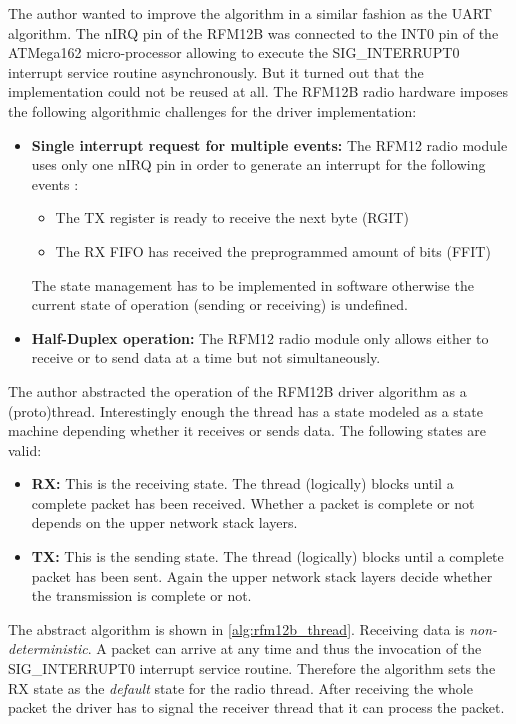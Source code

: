 The author wanted to improve the algorithm in a similar fashion as the UART algorithm. The nIRQ pin of the RFM12B was connected to the INT0 pin of the ATMega162 micro-processor allowing to execute the SIG\_INTERRUPT0 interrupt service routine asynchronously. But it turned out that the implementation could not be reused at all. The RFM12B radio hardware imposes the following algorithmic challenges for the driver implementation:

\begin{itemize}
    \item \textbf{Single interrupt request for multiple events:} The RFM12 radio module uses only one nIRQ pin in order to generate an interrupt for the following events \cite{sis4221_datasheet}:
\begin{itemize}
    \item The TX register is ready to receive the next byte (RGIT)
    \item The RX FIFO has received the preprogrammed amount of bits (FFIT)
\end{itemize}
The state management has to be implemented in software otherwise the current state of operation (sending or receiving) is undefined.
    \item \textbf{Half-Duplex operation:} The RFM12 radio module only allows either to receive or to send data at a time but not simultaneously.
\end{itemize}

The author abstracted the operation of the RFM12B driver algorithm as a (proto)thread. Interestingly enough the thread has a state modeled as a state machine depending whether it receives or sends data. The following states are valid:

\begin{itemize}
    \item \textbf{RX:} This is the receiving state. The thread (logically) blocks until a complete packet has been received. Whether a packet is complete or not depends on the upper network stack layers.
    \item \textbf{TX:} This is the sending state. The thread (logically) blocks until a complete packet has been sent. Again the upper network stack layers decide whether the transmission is complete or not.
\end{itemize}

The abstract algorithm is shown in \ref{alg:rfm12b_thread}. Receiving data is \emph{non-deterministic}. A packet can arrive at any time and thus the invocation of the SIG\_INTERRUPT0 interrupt service routine. Therefore the algorithm sets the RX state as the \emph{default} state for the radio thread. After receiving the whole packet the driver has to signal the receiver thread that it can process the packet.


